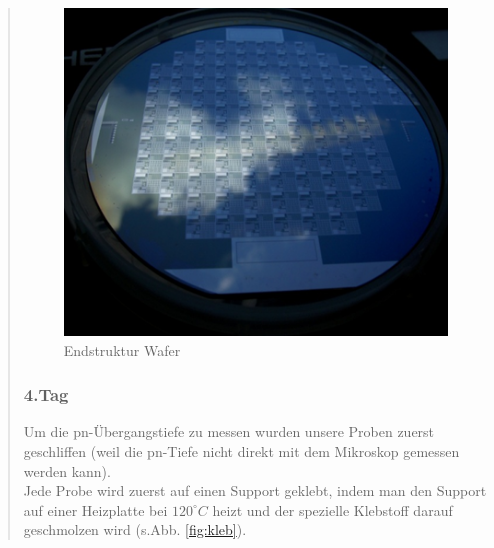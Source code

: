 \begin{quote}
    		\vspace{2em}


    		\begin{figure}[H]
				\hspace{2.5 cm}
                  \includegraphics[scale=1, trim = 0cm 0cm 0cm 0cm,clip]
                	{./HerstellungBilder/EndergebnisWafer120502.png}
                  \caption{Endstruktur Wafer}
                \label{fig:endwaf}
            \end{figure}

    		\vspace{2em}



    	\subsubsection{4.Tag}


    		Um die pn-Übergangstiefe zu messen wurden unsere Proben zuerst
    		geschliffen (weil die pn-Tiefe nicht direkt mit dem Mikroskop
    		gemessen werden kann).\\
			Jede Probe wird zuerst auf einen Support geklebt, indem man den
			Support auf einer Heizplatte bei $120^{\circ}C$ heizt und der
			spezielle Klebstoff darauf geschmolzen wird (s.Abb. \ref{fig:kleb}).

    		\vspace{2em}


\end{quote}
